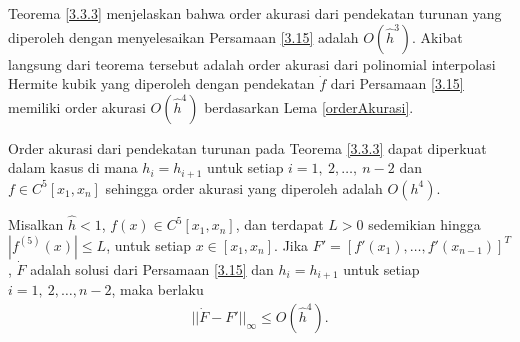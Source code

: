 Teorema \ref{3.3.3} menjelaskan bahwa order akurasi dari pendekatan turunan yang diperoleh dengan menyelesaikan Persamaan \eqref{3.15} adalah $O(\hat{h}^3)$. Akibat langsung dari teorema tersebut adalah order akurasi dari polinomial interpolasi Hermite kubik yang diperoleh dengan pendekatan $\dot{f}$ dari Persamaan \eqref{3.15} memiliki order akurasi $O(\hat{h}^4)$ berdasarkan Lema \ref{orderAkurasi}.

Order akurasi dari pendekatan turunan pada Teorema \ref{3.3.3} dapat diperkuat dalam kasus di mana $h_i = h_{i+1}$ untuk setiap $i=1,~2,\dots,~n-2$ dan $f \in C^5[x_1,x_n]$ sehingga order akurasi yang diperoleh adalah $O(h^4)$.

\begin{teorema}\label{oa4}
    Misalkan $\hat{h}<1$, $f(x)\in C^5[x_1,x_n]$, dan terdapat $L>0$ sedemikian hingga $|f^{(5)}(x)| \leq L$, untuk setiap $x\in[x_1,x_n]$. Jika $F'=[f'(x_1),\dots,f'(x_{n-1})]^T$, $\dot{F}$ adalah solusi dari Persamaan \eqref{3.15} dan $h_i = h_{i+1}$ untuk setiap $i=1,~2,\dots,n-2$, maka berlaku
    \begin{align*}
        ||\dot{F}-F'||_\infty \leq O(\hat{h}^4).
    \end{align*}
\end{teorema}

